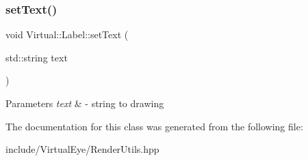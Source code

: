 \subsubsection{\texorpdfstring{set\+Text()}{setText()}}
{\footnotesize\ttfamily void Virtual\+::\+Label\+::set\+Text (\begin{DoxyParamCaption}\item[{std\+::string}]{text }\end{DoxyParamCaption})}


\begin{DoxyParams}{Parameters}
{\em text} & -\/ string to drawing \\
\hline
\end{DoxyParams}


The documentation for this class was generated from the following file\+:\begin{DoxyCompactItemize}
\item 
include/\+Virtual\+Eye/Render\+Utils.\+hpp\end{DoxyCompactItemize}
